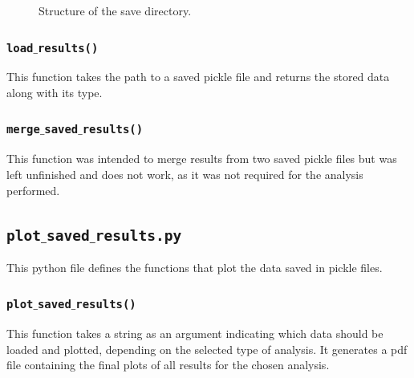 \begin{figure}[h!]
  \centering
  \caption{Structure of the save directory.}
  \label{fig:save_dir_struct}
\end{figure}

\subsubsection{\texttt{load$\_$results()}}
This function takes the path to a saved pickle file and returns the stored data along with its type.

\subsubsection{\texttt{merge$\_$saved$\_$results()}}
This function was intended to merge results from two saved pickle files but was left unfinished and does not work, as it was not required for the analysis performed.

\subsection{\texttt{plot$\_$saved$\_$results.py}}
This python file defines the functions that plot the data saved in pickle files.
\subsubsection{\texttt{\texttt{plot$\_$saved$\_$results()}}}
This function takes a string as an argument indicating which data should be loaded and plotted, depending on the selected type of analysis. It generates a pdf file containing the final plots of all results for the chosen analysis.


